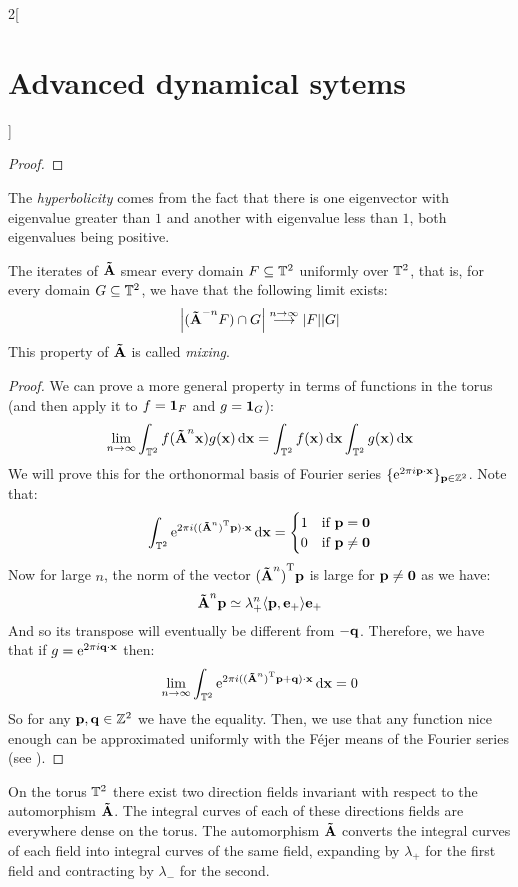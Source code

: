 \documentclass[../../../main_math.tex]{subfiles}
\begin{document}
\begin{multicols}{2}[\section{Advanced dynamical sytems}]
\begin{proof}
  \end{proof}
  \begin{remark}
    The \emph{hyperbolicity} comes from the fact that there is one eigenvector with eigenvalue greater than $1$ and another with eigenvalue less than $1$, both eigenvalues being positive.
  \end{remark}
  \begin{theorem}
    The iterates of $\boldsymbol{\mathrm{\tilde{A}}}$ smear every domain $F\subseteq \mathbb{T}^2$ uniformly over $\mathbb{T}^2$, that is, for every domain $G\subseteq \mathbb{T}^2$, we have that the following limit exists:
    $$
      \abs{(\boldsymbol{\mathrm{\tilde{A}}}^{-n} F)\cap G}\overset{n\to\infty}{\longrightarrow} \abs{F}\abs{G}
    $$
    This property of $\boldsymbol{\mathrm{\tilde{A}}}$ is called \emph{mixing}.
  \end{theorem}
  \begin{proof}
    We can prove a more general property in terms of functions in the torus (and then apply it to $f=\boldsymbol{\mathrm{1}}_{F}$ and $g=\boldsymbol{\mathrm{1}}_{G}$):
    $$
      \lim_{n\to\infty}\int_{\mathbb{T}^2} f(\boldsymbol{\mathrm{\tilde{A}}}^n \boldsymbol{\mathrm{x}}) g(\boldsymbol{\mathrm{x}})\dd{\boldsymbol{\mathrm{x}}}=\int_{\mathbb{T}^2} f(\boldsymbol{\mathrm{x}})\dd{\boldsymbol{\mathrm{x}}}\int_{\mathbb{T}^2} g(\boldsymbol{\mathrm{x}})\dd{\boldsymbol{\mathrm{x}}}
    $$
    We will prove this for the orthonormal basis of Fourier series $\{\mathrm{e}^{2\pi i \boldsymbol{\mathrm{p}}\cdot \boldsymbol{\mathrm{x}}}\}_{\boldsymbol{\mathrm{p}}\in\mathbb{Z}^2}$. Note that:
    $$
      \int_{\mathbb{T}^2} \mathrm{e}^{2\pi i ({(\boldsymbol{\mathrm{\tilde{A}}}^n)}^{\mathrm{T}}\boldsymbol{\mathrm{p}})\cdot \boldsymbol{\mathrm{x}}}\dd{\boldsymbol{\mathrm{x}}}=\begin{cases}
        1 & \text{if }\boldsymbol{\mathrm{p}}=\boldsymbol{\mathrm{0}}    \\
        0 & \text{if }\boldsymbol{\mathrm{p}}\ne \boldsymbol{\mathrm{0}}
      \end{cases}
    $$
    Now for large $n$, the norm of the vector ${(\boldsymbol{\mathrm{\tilde{A}}}^n)}^{\mathrm{T}}\boldsymbol{\mathrm{p}}$ is large for $\boldsymbol{\mathrm{p}}\ne \boldsymbol{\mathrm{0}}$ as we have:
    $$
      \boldsymbol{\mathrm{\tilde{A}}}^n\boldsymbol{\mathrm{p}} \simeq \lambda_+^n \langle \boldsymbol{\mathrm{p}}, \boldsymbol{\mathrm{e}}_+\rangle \boldsymbol{\mathrm{e}}_+
    $$
    And so its transpose will eventually be different from $-\boldsymbol{\mathrm{q}}$. Therefore, we have that if $g=\mathrm{e}^{2\pi i \boldsymbol{\mathrm{q}} \cdot \boldsymbol{\mathrm{x}}}$ then:
    $$
      \lim_{n\to\infty}\int_{\mathbb{T}^2} \mathrm{e}^{2\pi i({(\boldsymbol{\mathrm{\tilde{A}}}^n)}^{\mathrm{T}}\boldsymbol{\mathrm{p}}+\boldsymbol{\mathrm{q}})\cdot \boldsymbol{\mathrm{x}}}\dd{\boldsymbol{\mathrm{x}}}=0
    $$
    So for any $\boldsymbol{\mathrm{p}}, \boldsymbol{\mathrm{q}}\in\mathbb{Z}^2$ we have the equality. Then, we use that any function nice enough can be approximated uniformly with the Féjer means of the Fourier series (see ).
  \end{proof}
  \begin{theorem}
    On the torus $\mathbb{T}^2$ there exist two direction fields invariant with respect to the automorphism $\boldsymbol{\mathrm{\tilde{A}}}$. The integral curves of each of these directions fields are everywhere dense on the torus. The automorphism $\boldsymbol{\mathrm{\tilde{A}}}$ converts the integral curves of each field into integral curves of the same field, expanding by $\lambda_+$ for the first field and contracting by $\lambda_-$ for the second.

\end{theorem}
\end{multicols}
\end{document}
